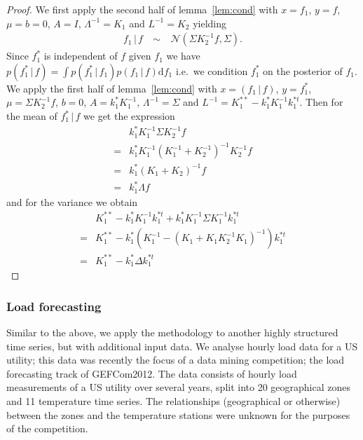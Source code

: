 \documentclass[twoside]{article}
\theoremstyle{definition}
\theoremstyle{remark}
\numberwithin{equation}{section}
\numberwithin{thm}{section}
\newcommand{\Normal}{\mathcal{N}}
\newcommand{\dist}{\ \sim\ }
\def\given{\,|\,}
\begin{document}
\begin{proof}
We first apply the second half of lemma~\ref{lem:cond} with $x=f_1$, $y=f$, $\mu=b=0$, $A=I$, $\Lambda^{-1} = K_1$ and $L^{-1} = K_2$ yielding
\begin{eqnarray}
f_1 \given f & \dist & \Normal(\Sigma K_2^{-1}f, \Sigma).
\end{eqnarray}
Since $f_1^*$ is independent of $f$ given $f_1$ we have $p(f_1^* \given f) = \int p(f_1^* \given f_1) p(f_1 \given f) \textrm{d}f_1$ i.e.~we condition $f_1^*$ on the posterior of $f_1$.
We apply the first half of lemma~\ref{lem:cond} with $x=(f_1\given f)$, $y=f_1^*$, $\mu=\Sigma K_2^{-1}f$, $b=0$, $A = k_1^*K_1^{-1}$, $\Lambda^{-1}=\Sigma$ and $L^{-1} = K_1^{**} - k_1^*K_1^{-1}k_1^{*t}$.
Then for the mean of $f_1^* \given f$ we get the expression
\begin{eqnarray}
& k_1^*K_1^{-1} \Sigma K_2^{-1}f \\
= & k_1^*K_1^{-1} (K_1^{-1} + K_2^{-1})^{-1} K_2^{-1}f \\
= & k_1^*(K_1 + K_2)^{-1}f \\
= & k_1^*\Lambda f
\end{eqnarray}
and for the variance we obtain
\begin{eqnarray}
& K_1^{**} - k_1^*K_1^{-1}k_1^{*t} + k_1^*K_1^{-1} \Sigma K_1^{-1}k_1^{*t} \\
= & K_1^{**} - k_1^*(K_1^{-1} - (K_1 + K_1K_2^{-1}K_1)^{-1})k_1^{*t} \\
= & K_1^{**} - k_1^*\Delta k_1^{*t}
\end{eqnarray}
\end{proof}

\subsubsection{Load forecasting}

Similar to the above, we apply the methodology to another highly structured time series, but with additional input data.
We analyse hourly load data for a US utility; this data was recently the focus of a data mining competition; the load forecasting track of GEFCom2012\footnotemark.
The data consists of hourly load measurements of a US utility over several years, split into 20 geographical zones and 11 temperature time series.
The relationships (geographical or otherwise) between the zones and the temperature stations were unknown for the purposes of the competition.
\end{document}
